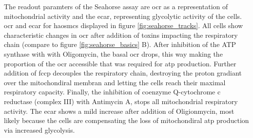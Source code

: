     The readout paramters of the Seahorse assay are \ac{ocr} as a representation of mitochondrial activity and the \ac{ecar}, representing glycolytic activity of the cells. \ac{ocr} and \ac{ecar} for \acp{haosmc} displayed in figure \ref{fig:seahorse_tracks}. All cells show characteristic changes in \ac{ocr} after addition of toxins impacting the respiratory chain (compare to figure \ref{fig:seahorse_basics} B). After inhibition of the ATP synthase with with Oligomycin, the basal \ac{ocr} drops, this way making the proportion of the \ac{ocr} accessible that was required for \ac{atp} production. Further addition of \ac{fccp} decouples the respiratory chain, destroying the proton gradiant over the mitochondiral membran and letting the cells reach their maximal respiratory capacity. Finally, the inhibition of coenzyme Q-cytochrome c reductase (complex III) with Antimycin A, stops all mitochondrial respiratory activity. The \ac{ecar} shows a mild increase after addition of Oligionmycin, most likely because the cells are compensating the loss of mitochondiral \ac{atp} production via increased glycolysis.

